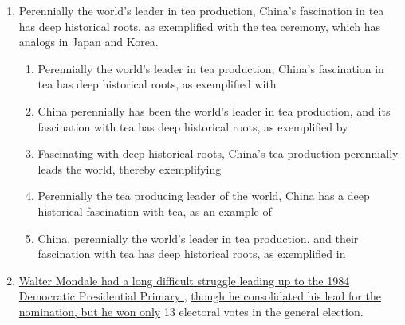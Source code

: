 \documentclass[12pt]{article}
\begin{document}
\begin{enumerate}[label=\textbf{\arabic*.}]
\begin{enumerate}[label=(\Alph*),itemsep=8pt]

\item if it is approved by the governor, would make there be fewer teachers

\item if the governor approves it, would result in the amount of teachers going down

\item if the governor approves it, would have the result of decreasing the number of teachers

\item if approved by the governor, would result in a reduction of the number of teachers

\item if approved by the governor, would decrease teachers

\end{enumerate}

\item Perennially the world's leader in tea production, China's fascination in tea has deep historical roots, as exemplified with the tea ceremony, which has analogs in Japan and Korea.

\begin{enumerate}[label=(\Alph*),itemsep=8pt]

\item Perennially the world's leader in tea production, China's fascination in tea has deep historical roots, as exemplified with

\item China perennially has been the world's leader in tea production, and its fascination with tea has deep historical roots, as exemplified by

\item Fascinating with deep historical roots, China's tea production perennially leads the world, thereby exemplifying

\item Perennially the tea producing leader of the world, China has a deep historical fascination with tea, as an example of

\item China, perennially the world's leader in tea production, and their fascination with tea has deep historical roots, as exemplified in

\end{enumerate}

\item \underline{Walter Mondale had a long difficult struggle leading up to the 1984 Democratic Presidential Primary ,} \underline{though he consolidated his lead for the nomination, but he won only} 13 electoral votes in the general election.


\end{enumerate}
\end{document}
